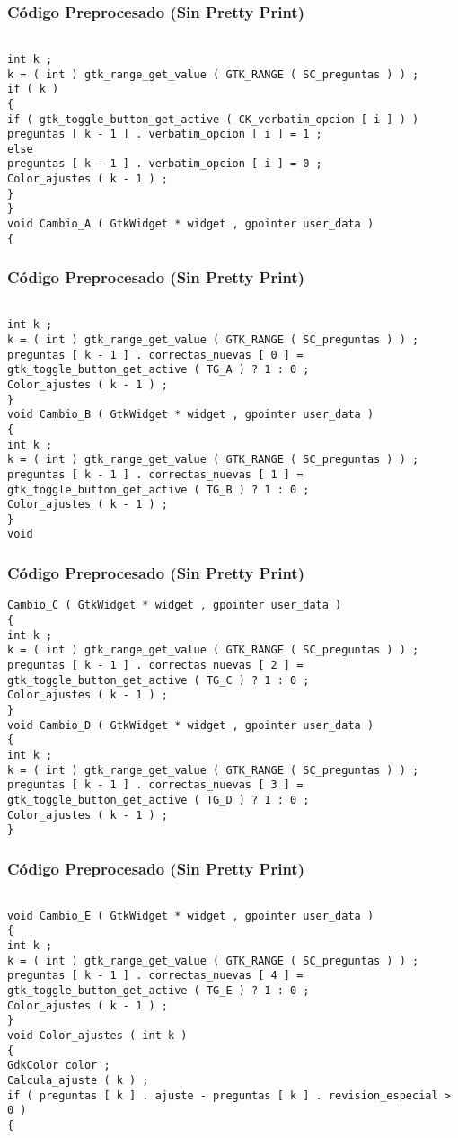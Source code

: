 \documentclass{beamer}
\begin{document}
\begin{frame}[fragile]
\frametitle{C\'odigo Preprocesado (Sin Pretty Print)}
\begin{lstlisting}[style=CStyle]

int k ; 
k = ( int ) gtk_range_get_value ( GTK_RANGE ( SC_preguntas ) ) ; 
if ( k ) 
{ 
if ( gtk_toggle_button_get_active ( CK_verbatim_opcion [ i ] ) ) 
preguntas [ k - 1 ] . verbatim_opcion [ i ] = 1 ; 
else 
preguntas [ k - 1 ] . verbatim_opcion [ i ] = 0 ; 
Color_ajustes ( k - 1 ) ; 
} 
} 
void Cambio_A ( GtkWidget * widget , gpointer user_data ) 
{ \end{lstlisting}
\end{frame}
\begin{frame}[fragile]
\frametitle{C\'odigo Preprocesado (Sin Pretty Print)}
\begin{lstlisting}[style=CStyle]

int k ; 
k = ( int ) gtk_range_get_value ( GTK_RANGE ( SC_preguntas ) ) ; 
preguntas [ k - 1 ] . correctas_nuevas [ 0 ] = gtk_toggle_button_get_active ( TG_A ) ? 1 : 0 ; 
Color_ajustes ( k - 1 ) ; 
} 
void Cambio_B ( GtkWidget * widget , gpointer user_data ) 
{ 
int k ; 
k = ( int ) gtk_range_get_value ( GTK_RANGE ( SC_preguntas ) ) ; 
preguntas [ k - 1 ] . correctas_nuevas [ 1 ] = gtk_toggle_button_get_active ( TG_B ) ? 1 : 0 ; 
Color_ajustes ( k - 1 ) ; 
} 
void \end{lstlisting}
\end{frame}
\begin{frame}[fragile]
\frametitle{C\'odigo Preprocesado (Sin Pretty Print)}
\begin{lstlisting}[style=CStyle]
Cambio_C ( GtkWidget * widget , gpointer user_data ) 
{ 
int k ; 
k = ( int ) gtk_range_get_value ( GTK_RANGE ( SC_preguntas ) ) ; 
preguntas [ k - 1 ] . correctas_nuevas [ 2 ] = gtk_toggle_button_get_active ( TG_C ) ? 1 : 0 ; 
Color_ajustes ( k - 1 ) ; 
} 
void Cambio_D ( GtkWidget * widget , gpointer user_data ) 
{ 
int k ; 
k = ( int ) gtk_range_get_value ( GTK_RANGE ( SC_preguntas ) ) ; 
preguntas [ k - 1 ] . correctas_nuevas [ 3 ] = gtk_toggle_button_get_active ( TG_D ) ? 1 : 0 ; 
Color_ajustes ( k - 1 ) ; 
} \end{lstlisting}
\end{frame}
\begin{frame}[fragile]
\frametitle{C\'odigo Preprocesado (Sin Pretty Print)}
\begin{lstlisting}[style=CStyle]

void Cambio_E ( GtkWidget * widget , gpointer user_data ) 
{ 
int k ; 
k = ( int ) gtk_range_get_value ( GTK_RANGE ( SC_preguntas ) ) ; 
preguntas [ k - 1 ] . correctas_nuevas [ 4 ] = gtk_toggle_button_get_active ( TG_E ) ? 1 : 0 ; 
Color_ajustes ( k - 1 ) ; 
} 
void Color_ajustes ( int k ) 
{ 
GdkColor color ; 
Calcula_ajuste ( k ) ; 
if ( preguntas [ k ] . ajuste - preguntas [ k ] . revision_especial > 0 ) 
{ \end{lstlisting}
\end{frame}
\end{document}
